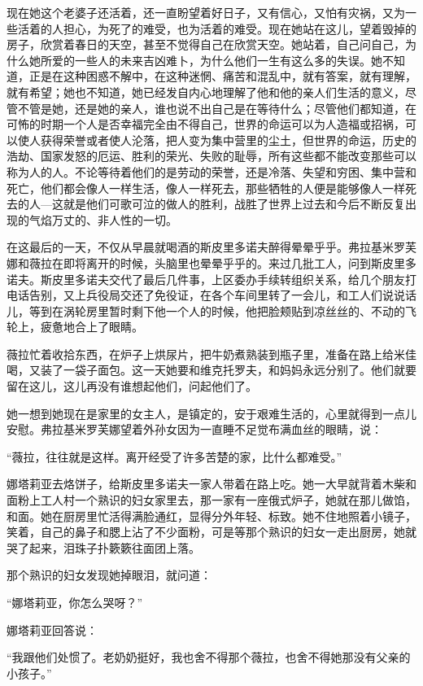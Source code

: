 现在她这个老婆子还活着，还一直盼望着好日子，又有信心，又怕有灾祸，又为一些活着的人担心，为死了的难受，也为活着的难受。现在她站在这儿，望着毁掉的房子，欣赏着春日的天空，甚至不觉得自己在欣赏天空。她站着，自己问自己，为什么她所爱的一些人的未来吉凶难卜，为什么他们一生有这么多的失误。她不知道，正是在这种困惑不解中，在这种迷惘、痛苦和混乱中，就有答案，就有理解，就有希望；她也不知道，她已经发自内心地理解了他和他的亲人们生活的意义，尽管不管是她，还是她的亲人，谁也说不出自己是在等待什么；尽管他们都知道，在可怖的时期一个人是否幸福完全由不得自己，世界的命运可以为人造福或招祸，可以使人获得荣誉或者使人沦落，把人变为集中营里的尘土，但世界的命运，历史的浩劫、国家发怒的厄运、胜利的荣光、失败的耻辱，所有这些都不能改变那些可以称为人的人。不论等待着他们的是劳动的荣誉，还是冷落、失望和穷困、集中营和死亡，他们都会像人一样生活，像人一样死去，那些牺牲的人便是能够像人一样死去的人—这就是他们可歌可泣的做人的胜利，战胜了世界上过去和今后不断反复出现的气焰万丈的、非人性的一切。

在这最后的一天，不仅从早晨就喝酒的斯皮里多诺夫醉得晕晕乎乎。弗拉基米罗芙娜和薇拉在即将离开的时候，头脑里也晕晕乎乎的。来过几批工人，问到斯皮里多诺夫。斯皮里多诺夫交代了最后几件事，上区委办手续转组织关系，给几个朋友打电话告别，又上兵役局交还了免役证，在各个车间里转了一会儿，和工人们说说话儿，等到在涡轮房里暂时剩下他一个人的时候，他把脸颊贴到凉丝丝的、不动的飞轮上，疲惫地合上了眼睛。

薇拉忙着收拾东西，在炉子上烘尿片，把牛奶煮熟装到瓶子里，准备在路上给米佳喝，又装了一袋子面包。这一天她要和维克托罗夫，和妈妈永远分别了。他们就要留在这儿，这儿再没有谁想起他们，问起他们了。

她一想到她现在是家里的女主人，是镇定的，安于艰难生活的，心里就得到一点儿安慰。弗拉基米罗芙娜望着外孙女因为一直睡不足觉布满血丝的眼睛，说：

“薇拉，往往就是这样。离开经受了许多苦楚的家，比什么都难受。”

娜塔莉亚去烙饼子，给斯皮里多诺夫一家人带着在路上吃。她一大早就背着木柴和面粉上工人村一个熟识的妇女家里去，那一家有一座俄式炉子，她就在那儿做馅，和面。她在厨房里忙活得满脸通红，显得分外年轻、标致。她不住地照着小镜子，笑着，自己的鼻子和腮上沾了不少面粉，可是等那个熟识的妇女一走出厨房，她就哭了起来，泪珠子扑簌簌往面团上落。

那个熟识的妇女发现她掉眼泪，就问道：

“娜塔莉亚，你怎么哭呀？”

娜塔莉亚回答说：

“我跟他们处惯了。老奶奶挺好，我也舍不得那个薇拉，也舍不得她那没有父亲的小孩子。”

